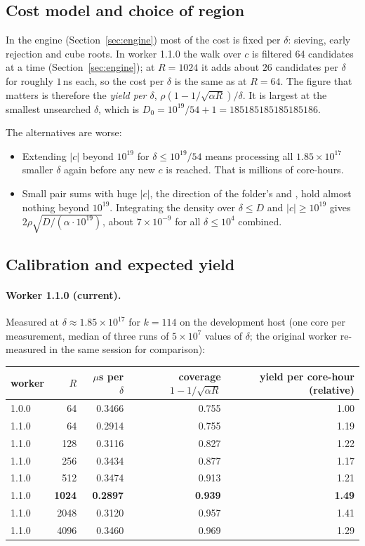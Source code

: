 \documentclass[11pt,a4paper]{article}
\theoremstyle{remark}
\newcommand{\code}[1]{\path{#1}}
\begin{document}
\subsection{Cost model and choice of region}
In the engine (Section~\ref{sec:engine}) most of the cost is fixed per $\delta$: sieving,
early rejection and cube roots. In worker 1.1.0 the walk over $c$ is filtered 64 candidates
at a time (Section~\ref{sec:engine}); at $R=1024$ it adds about $26$ candidates per $\delta$
for roughly $1$\,ns each, so the cost per $\delta$ is the same as at $R=64$. The figure that matters is therefore the \emph{yield per $\delta$},
$\rho(1-1/\sqrt{\alpha R})/\delta$. It is largest at the smallest unsearched $\delta$, which
is $D_0=10^{19}/54+1=185185185185185186$.

The alternatives are worse:
\begin{itemize}[leftmargin=*]
  \item Extending $|c|$ beyond $10^{19}$ for $\delta\le10^{19}/54$ means processing all
  $1.85\times10^{17}$ smaller $\delta$ again before any new $c$ is reached. That is millions
  of core-hours.
  \item Small pair sums with huge $|c|$, the direction of the folder's \code{xroots} and
  \code{xcurve}, hold almost nothing beyond $10^{19}$. Integrating the density over
  $\delta\le D$ and $|c|\ge10^{19}$ gives $2\rho\sqrt{D/(\alpha\cdot10^{19})}$, about
  $7\times10^{-9}$ for all $\delta\le10^4$ combined.
\end{itemize}

\subsection{Calibration and expected yield}
\paragraph{Worker 1.1.0 (current).} Measured at $\delta\approx1.85\times10^{17}$ for $k=114$ on
the development host (one core per measurement, median of three runs of $5\times10^7$
values of $\delta$; the original worker re-measured in the same session for comparison):

\begin{center}
\begin{tabular}{lrrrr}
\toprule
worker & $R$ & $\mu$s per $\delta$ & coverage $1-1/\sqrt{\alpha R}$ & yield per core-hour (relative)\\
\midrule
1.0.0 & 64 & 0.3466 & 0.755 & 1.00\\
1.1.0 & 64 & 0.2914 & 0.755 & 1.19\\
1.1.0 & 128 & 0.3116 & 0.827 & 1.22\\
1.1.0 & 256 & 0.3434 & 0.877 & 1.17\\
1.1.0 & 512 & 0.3474 & 0.913 & 1.21\\
1.1.0 & \textbf{1024} & \textbf{0.2897} & \textbf{0.939} & \textbf{1.49}\\
1.1.0 & 2048 & 0.3120 & 0.957 & 1.41\\
1.1.0 & 4096 & 0.3460 & 0.969 & 1.29\\
\bottomrule
\end{tabular}
\end{center}
\end{document}
